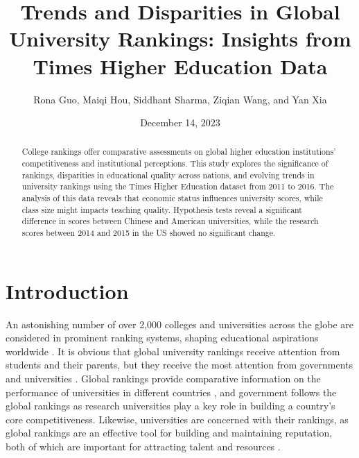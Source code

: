 \documentclass[a4paper]{article}
\title{Trends and Disparities in Global University Rankings: Insights from Times Higher Education Data}
\author{Rona Guo, Maiqi Hou, Siddhant Sharma, Ziqian Wang, and Yan Xia}
\affil{University of Colorado Boulder}
\affil{STAT 5000: Statistical Methods and Applications I}
\date{December 14, 2023}
\begin{document}
\maketitle

\begin{abstract}
College rankings offer comparative assessments on global higher education institutions' competitiveness and institutional perceptions. This study explores the significance of rankings, disparities in educational quality across nations, and evolving trends in university rankings using the Times Higher Education dataset from 2011 to 2016. The analysis of this data reveals that economic status influences university scores, while class size might impacts teaching quality. Hypothesis tests reveal a significant difference in scores between Chinese and American universities, while the research scores between 2014 and 2015 in the US showed no significant change.
\end{abstract}

\section*{Introduction}
An astonishing number of over 2,000 colleges and universities across the globe are considered in prominent ranking systems, shaping educational aspirations worldwide \cite{marope_rankings_2013}. It is obvious that global university rankings receive attention from students and their parents, but they receive the most attention from governments and universities \cite{sanoff_ussher_massimo_clarke_2007}. Global rankings provide comparative information on the performance of universities in different countries \cite{marope_rankings_2013}, and government follows the global rankings as research universities play a key role in building a country's core competitiveness\cite{hazelkorn_2013}. Likewise, universities are concerned with their rankings, as global rankings are an effective tool for building and maintaining reputation, both of which are important for attracting talent and resources \cite{marope_rankings_2013}.
\end{document}
